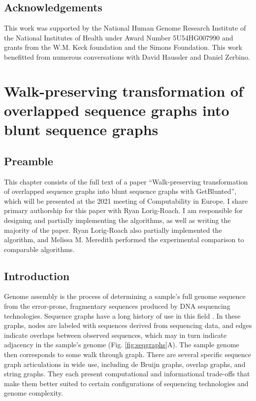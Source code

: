 \documentclass[11pt]{ucthesis}
\newcommand{\figref}[1]{Fig. \ref{fig:#1}}
\begin{document}
\section{Acknowledgements}

This work was supported by the National Human Genome Research Institute of the National Institutes of Health under
Award Number 5U54HG007990 and grants from the W.M. Keck foundation and the Simons Foundation. This work benefitted from numerous conversations with David Haussler and Daniel Zerbino.

\chapter{Walk-preserving transformation of overlapped sequence graphs into blunt sequence graphs}
\label{chapter:bluntifier}

\section{Preamble}

This chapter consists of the full text of a paper ``Walk-preserving transformation of overlapped sequence graphs into blunt sequence graphs with GetBlunted'', which will be presented at the 2021 meeting of Computability in Europe. I share primary authorship for this paper with Ryan Lorig-Roach. I am responsible for designing and partially implementing the algorithms, as well as writing the majority of the paper. Ryan Lorig-Roach also partially implemented the algorithm, and Melissa M. Meredith performed the experimental comparison to comparable algorithms.

\section{Introduction}

Genome assembly is the process of determining a sample's full genome sequence from the error-prone, fragmentary sequences produced by DNA sequencing technologies.
Sequence graphs have a long history of use in this field \cite{myers1995toward,pevzner2001eulerian,myers2005fragment}.
In these graphs, nodes are labeled with sequences derived from sequencing data, and edges indicate overlaps between observed sequences, which may in turn indicate adjacency in the sample's genome (\figref{seqgraphs}A).
The sample genome then corresponds to some walk through graph.
There are several specific sequence graph articulations in wide use, including de Bruijn graphs, overlap graphs, and string graphs.
They each present computational and informational trade-offs that make them better suited to certain configurations of sequencing technologies and genome complexity.
\end{document}
